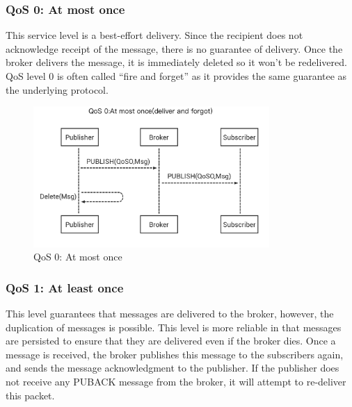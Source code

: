 \documentclass[\main/main.tex]{subfiles}
\begin{document}
\subsubsection{QoS 0: At most once}
This service level is a best-effort delivery. Since the recipient does not acknowledge receipt of the message, there is no guarantee of delivery. Once the broker delivers the message, it is immediately deleted so it won't be redelivered. QoS level 0 is often called “fire and forget” as it provides the same guarantee as the underlying protocol.
\begin{figure}[H]
    \begin{center}
        \includegraphics[width=0.8\textwidth]{mqtt_qos_at_most_once.png}
    \end{center}
    \caption{QoS 0: At most once}
    \label{fig:mqtt_qos_0}
\end{figure}

\subsubsection{QoS 1: At least once}
This level guarantees that messages are delivered to the broker, however, the duplication of messages is possible. This level is more reliable in that messages are persisted to ensure that they are delivered even if the broker dies. Once a message is received, the broker publishes this message to the subscribers again, and sends the message acknowledgment to the publisher. If the publisher does not receive any PUBACK message from the broker, it will attempt to re-deliver this packet.

\end{document}
